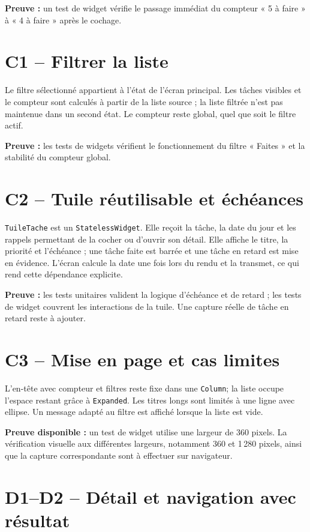 \documentclass[12pt,a4paper]{report}
\begin{document}
\textbf{Preuve :} un test de widget vérifie le passage immédiat du compteur « 5 à faire » à « 4 à faire » après le cochage.

\section{C1 -- Filtrer la liste}

Le filtre sélectionné appartient à l’état de l’écran principal. Les tâches visibles et le compteur sont calculés à partir de la liste source ; la liste filtrée n’est pas maintenue dans un second état. Le compteur reste global, quel que soit le filtre actif.

\textbf{Preuve :} les tests de widgets vérifient le fonctionnement du filtre « Faites » et la stabilité du compteur global.

\section{C2 -- Tuile réutilisable et échéances}

\texttt{TuileTache} est un \texttt{StatelessWidget}. Elle reçoit la tâche, la date du jour et les rappels permettant de la cocher ou d’ouvrir son détail. Elle affiche le titre, la priorité et l’échéance ; une tâche faite est barrée et une tâche en retard est mise en évidence. L’écran calcule la date une fois lors du rendu et la transmet, ce qui rend cette dépendance explicite.

\textbf{Preuve :} les tests unitaires valident la logique d’échéance et de retard ; les tests de widget couvrent les interactions de la tuile. Une capture réelle de tâche en retard reste à ajouter.

\section{C3 -- Mise en page et cas limites}

L’en-tête avec compteur et filtres reste fixe dans une \texttt{Column}; la liste occupe l’espace restant grâce à \texttt{Expanded}. Les titres longs sont limités à une ligne avec ellipse. Un message adapté au filtre est affiché lorsque la liste est vide.

\textbf{Preuve disponible :} un test de widget utilise une largeur de 360 pixels. La vérification visuelle aux différentes largeurs, notamment 360 et 1\,280 pixels, ainsi que la capture correspondante sont à effectuer sur navigateur.

\section{D1--D2 -- Détail et navigation avec résultat}
\end{document}
